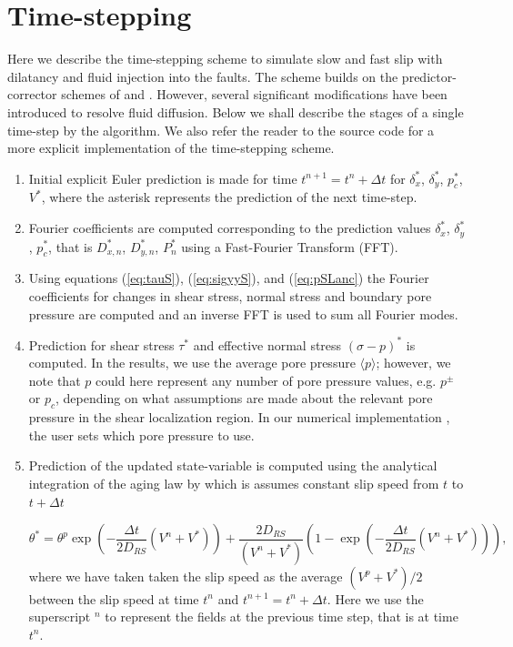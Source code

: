 \documentclass[draft]{agujournal2019}
\begin{document}
\section{Time-stepping} \label{sec:time}
Here we describe the time-stepping scheme to simulate slow and fast slip with dilatancy and fluid injection into the faults. The scheme builds on the predictor-corrector schemes of  and .  However, several significant modifications have been introduced to resolve fluid diffusion. Below we shall describe the stages of a single time-step by the algorithm. We also refer the reader to the source code \cite{elias_rafn_heimisson_Poro_SBIM} for a more explicit implementation of the time-stepping scheme. 
\begin{enumerate}

\item Initial explicit Euler prediction is made for time $t^{n+1} = t^n + \Delta t$ for $\delta_x^*$, $\delta_y^*$, $p_c^*$, $V^*$, where the asterisk represents the prediction of the next time-step.

\item Fourier coefficients are computed corresponding to the prediction values $\delta_x^*$, $\delta_y^*$, $p_c^*$, that is $D_{x,n}^*$, $D_{y,n}^*$, $P_{n}^*$ using a Fast-Fourier Transform (FFT).

\item Using equations (\ref{eq:tauS}), (\ref{eq:sigyyS}), and (\ref{eq:pSLanc}) the Fourier coefficients for changes in shear stress, normal stress and boundary pore pressure are computed and an inverse FFT is used to sum all Fourier modes.

\item Prediction for shear stress $\tau^*$ and effective normal stress $(\sigma - p)^*$ is computed. In the results, we use the average pore pressure $\langle p \rangle$; however, we note that $p$ could here represent any number of pore pressure values, e.g. $p^\pm$ or $p_c$, depending on what assumptions are made about the relevant pore pressure in the shear localization region. In our numerical implementation \cite{elias_rafn_heimisson_Poro_SBIM}, the user sets which pore pressure to use.

\item Prediction of the updated state-variable is computed using the analytical integration of the aging law by  which is assumes constant slip speed from $t$ to $t + \Delta t$ 

\begin{equation}
    \theta^* = \theta^p \exp \left( - \frac{\Delta t}{2 D_{RS}} (V^n + V^*)  \right) + \frac{2 D_{RS}}{(V^n + V^*)} \left( 1 - \exp \left( - \frac{\Delta t}{2 D_{RS}} (V^n + V^*)  \right)  \right),
\end{equation}
where we have taken taken the slip speed as the average $(V^p + V^*)/2$ between the slip speed at time $t^n$ and $t^{n+1} = t^n + \Delta t$. Here we use the superscript $^n$ to represent the fields at the previous time step, that is at time $t^n$.


\end{enumerate}
\end{document}
